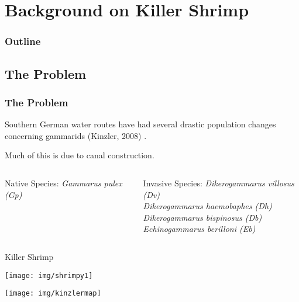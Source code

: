 \section{Background on Killer Shrimp}


\begin{frame}
  \frametitle{Outline}
  \tableofcontents[ currentsection ]
\end{frame}

\subsection{The Problem}

\begin{frame}
  \frametitle{The Problem}

  Southern German water routes have had several drastic population
  changes concerning gammarids (Kinzler, 2008) \cite{Dikerogammarus}.

  \vfill

  Much of this is due to canal construction. 

  \begin{columns}[t]
	\begin{block}{Native Species:}
	\textit{Gammarus pulex (Gp)}
	\end{block}

	\begin{block}{Invasive Species:}
    	\textit{Dikerogammarus villosus (Dv)}\\	
	\textit{Dikerogammarus haemobaphes (Dh)}\\
	\textit{Dikerogammarus bispinosus (Db)}\\
	\textit{Echinogammarus berilloni (Eb)}
	\end{block}
  \end{columns}
\end{frame}

\begin{frame}{Killer Shrimp}
  \centerline{\texttt{[image: img/shrimpy1]}}

\end{frame}

\begin{frame}
	\centerline{\texttt{[image: img/kinzlermap]}}
	
\end{frame}


